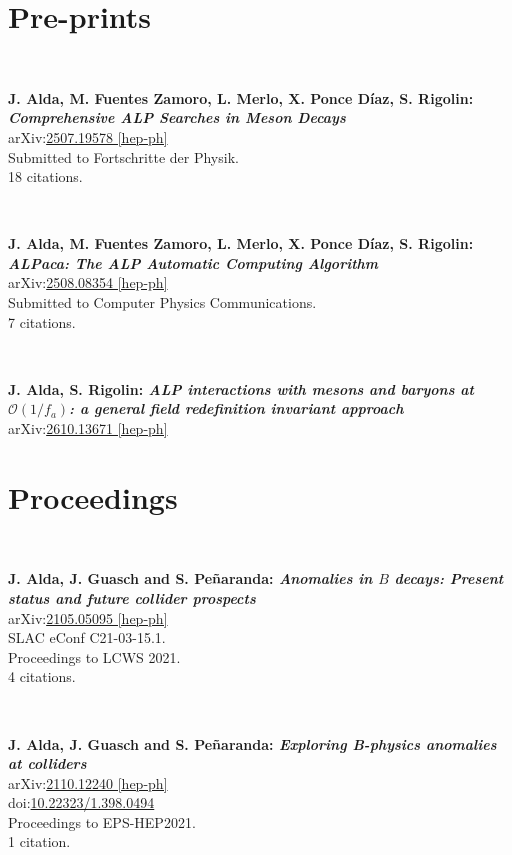 \documentclass[12pt, a4paper]{article}
\begin{document}
\section{Pre-prints}

~

\textbf{J. Alda, M. Fuentes Zamoro, L. Merlo, X. Ponce D\'iaz, S. Rigolin: \textit{Comprehensive ALP Searches in Meson Decays} }\\
arXiv:\href{https://arxiv.org/abs/2507.19578}{2507.19578 [hep-ph]}\\
Submitted to Fortschritte der Physik.\\
18 citations.

~

\textbf{J. Alda, M. Fuentes Zamoro, L. Merlo, X. Ponce D\'iaz, S. Rigolin: \textit{ALPaca: The ALP Automatic Computing Algorithm} }\\
arXiv:\href{https://arxiv.org/abs/2508.08354}{2508.08354 [hep-ph]}\\
Submitted to Computer Physics Communications.\\
7 citations.

~

\textbf{J. Alda, S. Rigolin: \textit{ALP interactions with mesons and baryons at $\mathcal{O}(1/f_a)$: a general field redefinition invariant approach}}\\
arXiv:\href{https://arxiv.org/abs/2610.13671}{2610.13671 [hep-ph]}

\section{Proceedings}

~

\textbf{J. Alda, J. Guasch and S. Peñaranda: \textit{Anomalies in $B$ decays: Present status and future collider prospects}}\\
arXiv:\href{https://arxiv.org/abs/2105.05095}{2105.05095 [hep-ph]}\\
SLAC eConf C21-03-15.1.\\
Proceedings to LCWS 2021.\\
4 citations.

~

\textbf{J. Alda, J. Guasch and S. Peñaranda: \textit{Exploring B-physics anomalies at colliders}}\\
arXiv:\href{https://arxiv.org/abs/2110.12240}{2110.12240 [hep-ph]}\\
doi:\href{https://doi.org/10.22323/1.398.0494}{10.22323/1.398.0494}\\
Proceedings to EPS-HEP2021.\\
1 citation.
\end{document}
